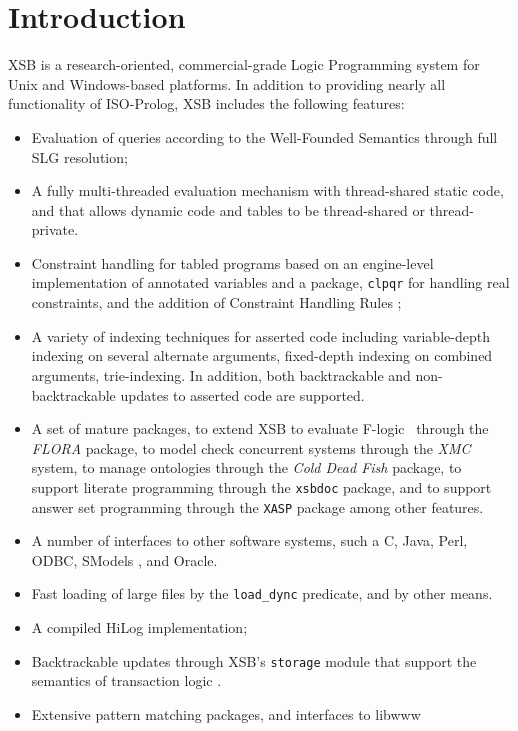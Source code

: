 \chapter{Introduction} \label{introduction}

XSB is a research-oriented, commercial-grade Logic Programming system
for Unix and Windows-based platforms.  In addition to providing nearly
all functionality of ISO-Prolog, XSB includes the following features:
\begin{itemize}
%
\item Evaluation of queries according to the Well-Founded Semantics
  \cite{VGRS91} through full SLG resolution;
%
\item A fully multi-threaded evaluation mechanism with thread-shared
  static code, and that allows dynamic code and tables to be
  thread-shared or thread-private.
%
\item Constraint handling for tabled programs based on an engine-level
  implementation of annotated variables and a package, {\tt clpqr} for
  handling real constraints, and the addition of Constraint Handling
  Rules \cite{};
% 
\item A variety of indexing techniques for asserted code 
  including variable-depth indexing on several alternate arguments,
  fixed-depth indexing on combined arguments, trie-indexing.  In
  addition, both backtrackable and non-backtrackable updates to asserted
  code are supported.
%
\item A set of mature packages, to extend XSB to evaluate
  F-logic~\cite{KLW95} through the {\em FLORA} package, to model check
  concurrent systems through the {\em XMC} system, to manage
  ontologies through the {\em Cold Dead Fish} package, to support
  literate programming through the {\tt xsbdoc} package, and to
  support answer set programming through the {\tt XASP} package among
  other features.
%
\item A number of interfaces to other software systems, such a C, Java,
  Perl, ODBC, SModels \cite{NiSi97}, and Oracle.
%
\item Fast loading of large files by the {\tt load\_dync}
  predicate, and by other means.
%
\item A compiled HiLog implementation;
%
\item Backtrackable updates through XSB's {\tt storage} module that
  support the semantics of transaction logic \cite{BoKi94}.
%
\item Extensive pattern matching packages, and interfaces to libwww

\end{itemize}
